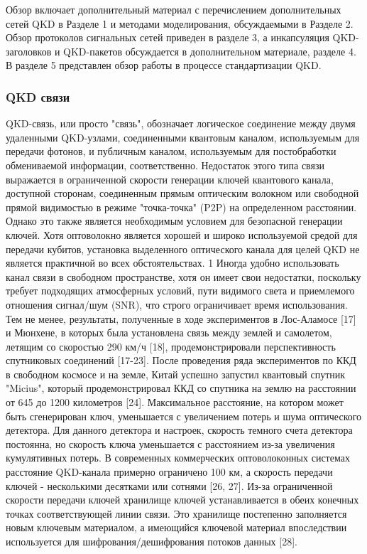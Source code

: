 Обзор включает дополнительный материал с перечислением дополнительных сетей QKD в Разделе 1 и методами моделирования, обсуждаемыми в Разделе 2. Обзор протоколов сигнальных сетей приведен в разделе 3, а инкапсуляция QKD-заголовков и QKD-пакетов обсуждается в дополнительном материале, разделе 4. В разделе 5 представлен обзор работы в процессе стандартизации QKD.
\subsubsection{QKD связи}
QKD-связь, или просто "связь", обозначает логическое соединение между двумя удаленными QKD-узлами, соединенными квантовым каналом, используемым для передачи фотонов, и публичным каналом, используемым для постобработки обмениваемой информации, соответственно. Недостаток этого типа связи выражается в ограниченной скорости генерации ключей квантового канала, доступной сторонам, соединенным прямым оптическим волокном или свободной прямой видимостью в режиме "точка-точка" (P2P) на определенном расстоянии.
Однако это также является необходимым условием для безопасной генерации ключей.
Хотя оптоволокно является хорошей и широко используемой средой для передачи кубитов, установка выделенного оптического канала для целей QKD не является практичной во всех обстоятельствах. 1 Иногда удобно использовать канал связи в свободном пространстве, хотя он имеет свои недостатки, поскольку требует подходящих атмосферных условий, пути видимого света и приемлемого отношения сигнал/шум (SNR), что строго ограничивает время использования. Тем не менее, результаты, полученные в ходе экспериментов в Лос-Аламосе [17] и Мюнхене, в которых была установлена связь между землей и самолетом, летящим со скоростью 290 км/ч [18], продемонстрировали перспективность спутниковых соединений [17-23]. После проведения ряда экспериментов по ККД в свободном космосе и на земле, Китай успешно запустил квантовый спутник "Micius", который продемонстрировал ККД со спутника на землю на расстоянии от 645 до 1200 километров [24].
Максимальное расстояние, на котором может быть сгенерирован ключ, уменьшается с увеличением потерь и шума оптического детектора. Для данного детектора и настроек, скорость темного счета детектора постоянна, но скорость ключа уменьшается с расстоянием из-за увеличения кумулятивных потерь. В современных коммерческих оптоволоконных системах расстояние QKD-канала примерно ограничено 100 км, а скорость передачи ключей - несколькими десятками или сотнями [26, 27]. Из-за ограниченной скорости передачи ключей хранилище ключей устанавливается в обеих конечных точках соответствующей линии связи. Это хранилище постепенно заполняется новым ключевым материалом, а имеющийся ключевой материал впоследствии используется для шифрования/дешифрования потоков данных [28].
